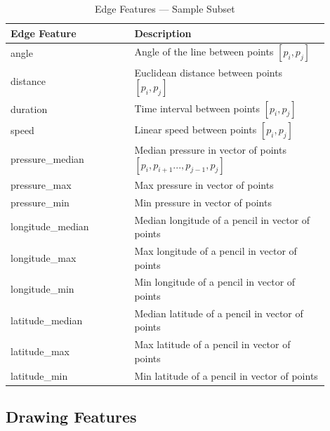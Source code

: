 \begin{table}[htb]
\centering
\begin{tabular}{p{0.35\linewidth} | p{0.55\linewidth}}
\hline
Edge Feature & Description \\
\hline
angle & Angle of the line between points $[p_i, p_j]$ \\
distance & Euclidean distance between points $[p_i, p_j]$ \\
duration & Time interval between points $[p_i, p_j]$ \\
speed & Linear speed between points $[p_i, p_j]$ \\
pressure\_median & Median pressure in vector of points $[p_i, p_{i+1}..., p_{j-1}, p_j]$ \\
pressure\_max & Max pressure in vector of points \\
pressure\_min & Min pressure in vector of points \\
longitude\_median & Median longitude of a pencil in vector of points \\
longitude\_max & Max longitude of a pencil in vector of points \\
longitude\_min & Min longitude of a pencil in vector of points \\
latitude\_median & Median latitude of a pencil in vector of points \\
latitude\_max & Max latitude of a pencil in vector of points \\
latitude\_min & Min latitude of a pencil in vector of points \\
\hline
\end{tabular}
\caption{Edge Features --- Sample Subset}
\label{features-edge}
\end{table}

\subsection{Drawing Features}

